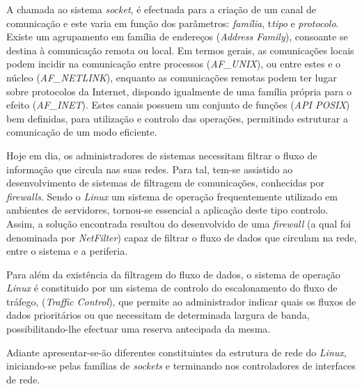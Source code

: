 A chamada ao sistema \textit{socket}, é efectuada para a criação de um canal de comunicação e este varia em função dos parâmetros: \textit{família}, t\textit{tipo} e \textit{protocolo}.
Existe um agrupamento em família de endereços (\textit{Address Family}), consoante se destina à comunicação remota ou local.
Em termos gerais, as comunicações locais podem incidir na comunicação entre processos (\textit{AF\_UNIX}), ou entre estes e o núcleo (\textit{AF\_NETLINK}), enquanto as comunicações remotas podem ter lugar sobre protocolos da Internet, dispondo igualmente de uma família própria para o efeito (\textit{AF\_INET}).
Estes canais possuem um conjunto de funções (\textit{API POSIX}) bem definidas, para utilização e controlo das operações, permitindo estruturar a comunicação de um modo eficiente.



Hoje em dia, os administradores de sistemas necessitam filtrar o fluxo de informação que circula nas suas redes.
Para tal, tem-se assistido ao desenvolvimento de sistemas de filtragem de comunicações, conhecidas por \textit{firewalls}.
Sendo o \textit{Linux} um sistema de operação frequentemente utilizado em ambientes de servidores, tornou-se essencial a aplicação deste tipo controlo.
Assim, a solução encontrada resultou do desenvolvido de uma \textit{firewall} (a qual foi denominada por \textit{NetFilter}) capaz de filtrar o fluxo de dados que circulam na rede, entre o sistema e a periferia.

Para além da existência da filtragem do fluxo de dados, o sistema de operação \textit{Linux} é constituido por um sistema de controlo do escalonamento do fluxo de tráfego, (\textit{Traffic Control}), que permite ao administrador indicar quais os fluxos de dados prioritários ou que necessitam de determinada largura de banda, possibilitando-lhe efectuar uma reserva antecipada da mesma.
 
Adiante apresentar-se-ão diferentes constituintes da estrutura de rede do \textit{Linux}, iniciando-se pelas famílias de \textit{sockets} e terminando nos controladores de interfaces de rede.

